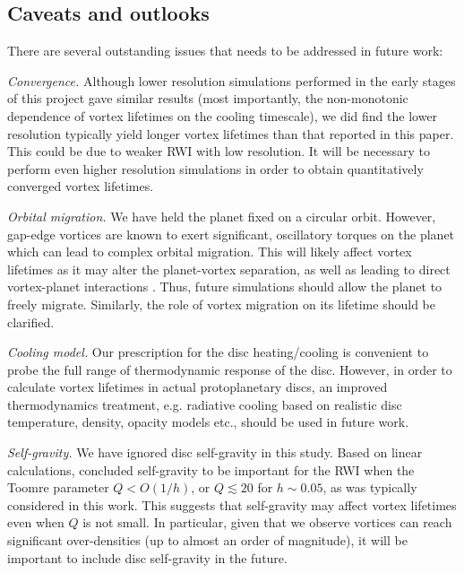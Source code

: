 
\subsection{Caveats and outlooks}
There are several outstanding issues that needs to be addressed
in future work: 

\emph{Convergence.} Although lower resolution simulations performed in
the early stages of this project gave similar results  
(most importantly, the non-monotonic dependence of vortex lifetimes on
the cooling timescale), we did find the lower resolution 
typically yield longer vortex lifetimes than that reported in this
paper. This could be due to weaker RWI with low resolution.  
It will be necessary to perform even higher resolution  simulations
in order to obtain quantitatively converged vortex lifetimes.  


  \emph{Orbital migration.} We have held the planet fixed on a circular
  orbit. However, gap-edge vortices are known to exert
  significant, oscillatory torques on the planet \citep{li09}
  which can lead to complex orbital migration. This will likely affect
  vortex lifetimes as it may alter the planet-vortex separation, as
  well as leading to direct vortex-planet interactions
  \citep{lin10,ataiee14}. Thus, 
  future simulations should allow the planet to freely
  migrate. Similarly, the role of vortex migration on its lifetime
  should be clarified. 


  \emph{Cooling model.} Our prescription for the disc 
  heating/cooling is convenient to probe the full range of
  thermodynamic response of the disc. However, in order to calculate 
  vortex lifetimes in actual 
  protoplanetary discs, an improved thermodynamics treatment,
  e.g. radiative cooling based on realistic disc temperature, density,
  opacity models etc., should be used in future work.   

\emph{Self-gravity.} We have ignored disc self-gravity in this
study. Based on linear calculations, \cite{lovelace13} concluded
self-gravity to be important for the RWI when the Toomre parameter $Q<O(1/h)$, or
$Q\lesssim 20$ for $h\sim0.05$, as was typically considered in this
work. This suggests that self-gravity may affect vortex lifetimes even
when $Q$ is not small. In particular, given that
we observe vortices can reach significant over-densities (up to almost
an order of magnitude), it will be important to include disc
self-gravity in the future. %
 
